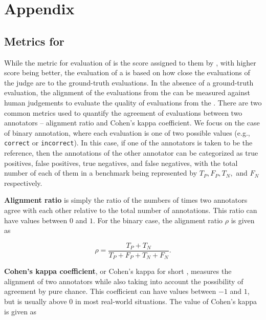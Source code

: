 \appendix
\renewcommand{\thesection}{\Alph{section}}

\section{Appendix}
\label{sec:Appendix}

\subsection{Metrics for \judgemodels}
\label{app:metrics}

While the metric for evaluation of \evaluatormodels is the score assigned to them by \judgemodels, with higher score being better, the evaluation of a \judgemodel is based on how close the evaluations of the judge are to the ground-truth evaluations. In the absence of a ground-truth evaluation, the alignment of the evaluations from the \judgemodel can be measured against human judgements to evaluate the quality of evaluations from the \judgemodels. There are two common metrics used to quantify the agreement of evaluations between two annotators -- alignment ratio 
and Cohen's kappa coefficient. We focus on the case of binary annotation, where each evaluation is one of two possible values (e.g., \texttt{correct} or \texttt{incorrect}). In this case, if one of the annotators is taken to be the reference, then the annotations of the other annotator can be categorized as true positives, false positives, true negatives, and false negatives, with the total number of each of them in a benchmark being represented by $T_P, F_P, T_N,$ and $F_N$ respectively.

\textbf{Alignment ratio} is simply the ratio of the numbers of times two annotators agree with each other relative to the total number of annotations. This ratio can have values between $0$ and $1$. For the binary case, the alignment ratio $\rho$ 
is given as

\begin{equation}
    \rho = \frac{T_P + T_N}{T_P + F_P + T_N + F_N}.
\end{equation}

\textbf{Cohen's kappa coefficient}, or Cohen's kappa for short \citep{cohen1960kappa}, measures the alignment of two annotators while also taking into account the possibility of agreement by pure chance. This coefficient can have values between $-1$ and $1$, but is usually above $0$ in most real-world situations. The value of Cohen's kappa is given as

